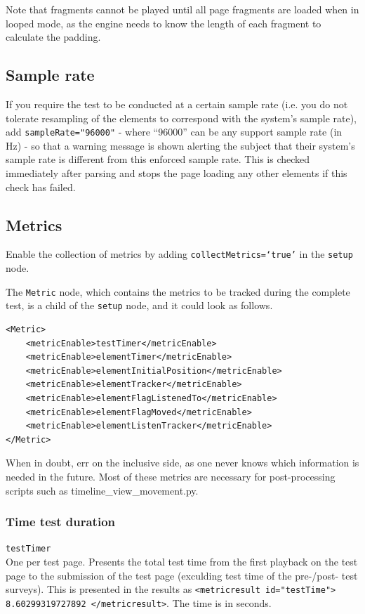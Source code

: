 \documentclass[11pt, oneside]{article}   	%
\begin{document}
		Note that fragments cannot be played until all page fragments are loaded when in looped mode, as the engine needs to know the length of each fragment to calculate the padding.

	\subsection{Sample rate}
	\label{sec:samplerate}
		If you require the test to be conducted at a certain sample rate (i.e. you do not tolerate resampling of the elements to correspond with the system's sample rate), add \texttt{sampleRate="96000"} - where ``96000'' can be any support sample rate (in Hz) - so that a warning message is shown alerting the subject that their system's sample rate is different from this enforced sample rate. This is checked immediately after parsing and stops the page loading any other elements if this check has failed.

	\subsection{Metrics}
		Enable the collection of metrics by adding \texttt{collectMetrics=`true'} in the \texttt{setup} node. %

		The \texttt{Metric} node, which contains the metrics to be tracked during the complete test, is a child of the \texttt{setup} node, and it could look as follows.

		\begin{lstlisting}
<Metric>
	<metricEnable>testTimer</metricEnable>
	<metricEnable>elementTimer</metricEnable>
	<metricEnable>elementInitialPosition</metricEnable>
	<metricEnable>elementTracker</metricEnable>
	<metricEnable>elementFlagListenedTo</metricEnable>
	<metricEnable>elementFlagMoved</metricEnable>
	<metricEnable>elementListenTracker</metricEnable>
</Metric>
		\end{lstlisting}

		When in doubt, err on the inclusive side, as one never knows which information is needed in the future. Most of these metrics are necessary for post-processing scripts such as timeline\_view\_movement.py. 

		\subsubsection{Time test duration}
			\texttt{testTimer}\\
			One per test page. Presents the total test time from the first playback on the test page to the submission of the test page (exculding test time of the pre-/post- test surveys). This is presented in the results as \texttt{<metricresult id="testTime"> 8.60299319727892 </metricresult>}. The time is in seconds.
\end{document}
